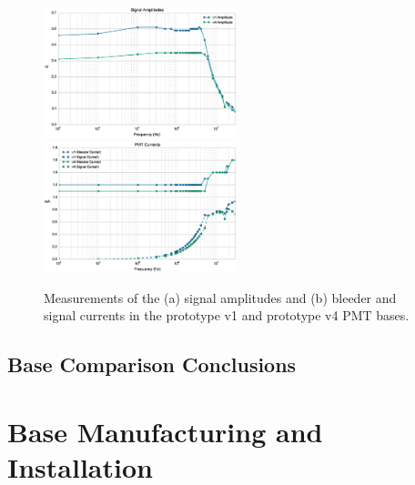 \begin{figure}[h]
	\centerline{
		\mbox{\includegraphics[width=0.5\textwidth]{figures/Test_v4_Amp.eps} \includegraphics[width=0.5\textwidth]{figures/Test_v4_Current.eps}}}
	\caption{Measurements of the (a) signal amplitudes and (b) bleeder and signal currents in the prototype v1 and prototype v4 PMT bases.}
	\label{fig:test-v4}
\end{figure}

\subsection{Base Comparison Conclusions}

\section{Base Manufacturing and Installation}
